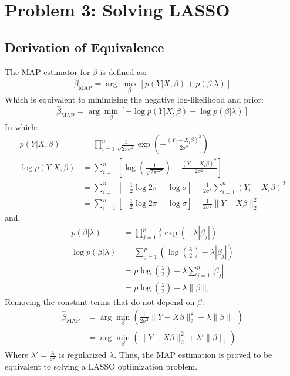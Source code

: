 \documentclass[11pt, a4paper, oneside]{memoir}
\begin{document}
\chapter{Problem 3: Solving LASSO}
\section{Derivation of Equivalence}
The MAP estimator for $\beta$ is defined as:
\[ \hat{\beta}_{\text{MAP}}  = \arg \max_{\beta} \left[ p(Y | X, \beta) + p(\beta | \lambda) \right] \]
Which is equivalent to minimizing the negative log-likelihood and prior:
\[ \hat{\beta}_{\text{MAP}} = \arg \min_{\beta} \left[ -\log p(Y | X, \beta) - \log p(\beta | \lambda) \right] \]
In which:
\begin{align*}
p(Y | X, \beta) &= \prod_{i=1}^{n} \frac{1}{\sqrt{2\pi\sigma^2}} \exp \left( -\frac{(Y_i - X_i\beta)^2}{2\sigma^2} \right) \\
\log p(Y | X, \beta) &= \sum_{i=1}^{n} \left[ \log \left( \frac{1}{\sqrt{2\pi\sigma^2}} \right) - \frac{(Y_i - X_i\beta)^2}{2\sigma^2} \right] \\
&= \sum_{i=1}^{n} \left[ -\frac{1}{2}\log{2\pi} -\log\sigma \right] - \frac{1}{2\sigma^2} \sum_{i=1}^{n} (Y_i - X_i\beta)^2 \\
&= \sum_{i=1}^{n} \left[ -\frac{1}{2}\log{2\pi} -\log\sigma \right] - \frac{1}{2\sigma^2} \|Y - X\beta\|_2^2
\end{align*}
and,
\begin{align*}
p(\beta | \lambda) &= \prod_{j=1}^{p} \frac{\lambda}{2} \exp (-\lambda |\beta_j|) \\
\log p(\beta | \lambda) &= \sum_{j=1}^{p} \left( \log \left( \frac{\lambda}{2} \right) - \lambda |\beta_j| \right) \\
&= p \log \left( \frac{\lambda}{2} \right) - \lambda \sum_{j=1}^{p} |\beta_j| \\
&= p \log \left( \frac{\lambda}{2} \right) - \lambda \|\beta\|_1
\end{align*}
Removing the constant terms that do not depend on $\beta$:
\begin{align*}
\hat{\beta}_{\text{MAP}} &= \arg \min_{\beta} \left( \frac{1}{2\sigma^2} \|Y - X\beta\|_2^2 + \lambda \|\beta\|_1 \right) \\
&= \arg \min_{\beta} \left( \|Y - X\beta\|_2^2 + \lambda' \|\beta\|_1 \right)
\end{align*}
Where $\lambda' = \frac{\lambda}{\sigma^2}$ is regularized $\lambda$. Thus, the MAP estimation is proved to be equivalent to solving a LASSO optimization problem.
\end{document}
